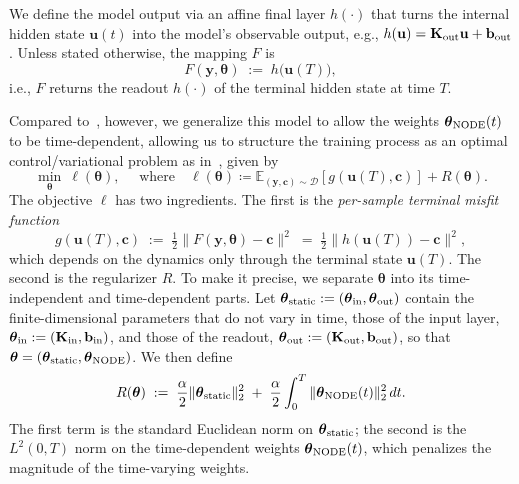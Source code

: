 \documentclass[pdflatex,sn-mathphys-num]{sn-jnl}%
\newcommand{\E}{\mathbb{E}}
\newcommand{\bfu}{\mathbf{u}}
\newcommand{\bfc}{\mathbf{c}}
\newcommand{\bfy}{\mathbf{y}}
\newcommand{\bfb}{\mathbf{b}}
\newcommand{\bfK}{\mathbf{K}}
\newcommand{\bftheta}{\boldsymbol{\theta}}
\theoremstyle{thmstyleone}%
\theoremstyle{thmstyletwo}%
\theoremstyle{thmstylethree}%
\begin{document}
 
We define the model output via an affine final layer \(h(\cdot)\) that turns the internal hidden state 
$\bfu(t)$ into the model’s observable output, e.g.,
\(h(\bfu)=\bfK_{\rm out}\bfu+\bfb_{\rm out}\).
%
Unless stated otherwise, the mapping $F$ is
\begin{equation*}
F(\bfy,\bftheta) \;:=\; h\!\big(\bfu(T)\big),
\end{equation*}
i.e., \(F\) returns the readout $h(\cdot)$ of the terminal hidden state at time \(T\).
 
 
 
 
 
Compared to~\cite{ChenEtAl2018}, however, we generalize this model to allow the weights $\bftheta_{\rm NODE}(t)$ to be time-dependent, allowing us to structure the training process as an optimal control/variational problem as in~\cite{gunther}, given by
%
\begin{equation}\label{eq:control_problem}
\min_{\bftheta}\ \ell(\bftheta), \quad\text{ where} \quad \ell(\bftheta) \coloneqq \E_{(\bfy,\bfc)\sim\mathcal{D}}\left[ g(\bfu(T),\bfc) \right] + R(\bftheta).
\end{equation}
%
The objective $\ell$ has two ingredients. The first is the \emph{per-sample terminal misfit function}
\begin{equation}\label{eq:misfit}
    g(\bfu(T),\bfc) \;:=\; \tfrac12\|F(\bfy,\bftheta) - \bfc\|^2 \;=\; \tfrac12\|h(\bfu(T)) - \bfc\|^2,
\end{equation}
which depends on the dynamics only through the terminal state $\bfu(T)$.
%
The second is the regularizer $R$. To make it precise, we separate $\bftheta$ into its time-independent and time-dependent parts. Let $\bftheta_{\rm static} := (\bftheta_{\rm in},\bftheta_{\rm out})$ contain the finite-dimensional parameters that do not vary in time, those of the input layer, $\bftheta_{\rm in} := (\bfK_{\rm in},\bfb_{\rm in})$, and those of the readout, $\bftheta_{\rm out} := (\bfK_{\rm out},\bfb_{\rm out})$, so that $\bftheta = (\bftheta_{\rm static}, \bftheta_{\rm NODE})$. We then define
\begin{equation}\label{eq:regularizer}
    R(\bftheta) \;:=\; \frac{\alpha}{2}\|\bftheta_{\rm static}\|_2^2 \;+\; \frac{\alpha}{2}\int_0^T \|\bftheta_{\rm NODE}(t)\|_2^2\,dt.
\end{equation}
%
The first term is the standard Euclidean norm on $\bftheta_{\rm static}$; the second is the $L^2(0,T)$ norm on the time-dependent weights $\bftheta_{\rm NODE}(t)$, which penalizes the magnitude of the time-varying weights.
 
\end{document}

